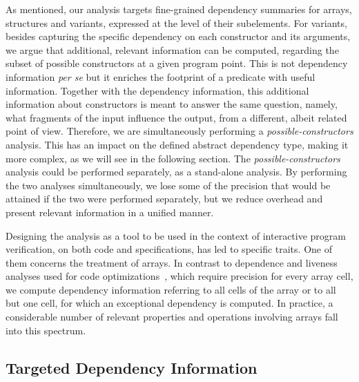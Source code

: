 \documentclass[11pt]{article}
\begin{document}
As mentioned, our analysis targets fine-grained dependency summaries for arrays,
structures and variants, expressed at the level of their subelements. For 
variants, besides capturing the specific dependency on each constructor 
and its arguments, we argue that additional, relevant information can be 
computed, regarding the subset of possible constructors at a given program 
point. This is not dependency information \emph{per se} but it enriches the 
footprint of a predicate with useful information. Together with the dependency 
information, this additional information about constructors is meant to answer 
the same question, namely, what fragments of the input influence the output, 
from a different, albeit related point of view. Therefore, we are 
simultaneously performing a \emph{possible-constructors} analysis. This has an 
impact on the defined abstract dependency type, making it more complex, as we will see in 
the following section. The \emph{possible-constructors} analysis could be 
performed separately, as a stand-alone analysis. By performing the two analyses 
simultaneously, we lose some of the precision that would be attained if the two 
were performed separately, but we reduce overhead and present relevant 
information in a unified manner.  

Designing the analysis as a tool to be used in the context of
interactive program verification, on both code and specifications, has
led to specific traits. One of them concerns the treatment of
arrays. In contrast to dependence and liveness analyses used for code
optimizations~\cite{gross90}, which require precision for every
array cell, we compute dependency information referring to all cells
of the array or to all but one cell, for which an exceptional
dependency is computed.  In practice, a considerable number of
relevant properties and operations involving arrays fall into this
spectrum.

 


\subsection{Targeted Dependency Information}\label{sec:intro:example}
\end{document}
